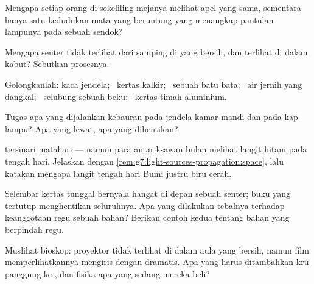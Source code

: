 \begin{exercise}[$\star$]\label{exo:g7:light-sources-propagation:4}
Mengapa setiap orang di sekeliling mejanya melihat apel yang sama,
sementara hanya satu kedudukan mata yang beruntung yang menangkap
pantulan lampunya pada sebuah sendok?
\end{exercise}

\begin{exercise}[$\star$]\label{exo:g7:light-sources-propagation:5}
Mengapa  senter tidak terlihat dari samping di  yang
bersih, dan terlihat di dalam kabut? Sebutkan prosesnya.
\end{exercise}

\begin{exercise}[$\star$]\label{exo:g7:light-sources-propagation:6}
Golongkanlah: kaca jendela; \ kertas kalkir; \ sebuah batu bata; \ air
jernih yang dangkal; \ selubung sebuah  beku; \ kertas timah
aluminium.
\end{exercise}

\begin{exercise}[$\star$]\label{exo:g7:light-sources-propagation:7}
Tugas apa yang dijalankan kebauran pada jendela kamar mandi dan pada
kap lampu? Apa yang lewat, apa yang dihentikan?
\end{exercise}

\begin{exercise}[$\star$]\label{exo:g7:light-sources-propagation:8}
 tersinari matahari --- namun para antariksawan bulan melihat
langit hitam pada tengah hari. Jelaskan dengan
\cref{rem:g7:light-sources-propagation:space}, lalu katakan mengapa
langit tengah hari Bumi justru biru cerah.
\end{exercise}

\begin{exercise}[$\star\star$]\label{exo:g7:light-sources-propagation:9}
Selembar kertas tunggal bernyala hangat di depan sebuah senter; buku
yang tertutup menghentikan  seluruhnya. Apa yang dilakukan
tebalnya terhadap keanggotaan regu sebuah bahan? Berikan contoh kedua
tentang bahan yang berpindah regu.
\end{exercise}

\begin{exercise}[$\star\star$]\label{exo:g7:light-sources-propagation:10}
Muslihat bioskop:  proyektor tidak terlihat di dalam aula yang
bersih, namun film memperlihatkannya mengiris  dengan dramatis.
Apa yang harus ditambahkan kru panggung ke , dan fisika apa
yang sedang mereka beli?
\end{exercise}

